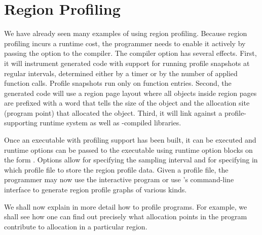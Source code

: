 \documentclass[12pt]{book}
\begin{document}
\chapter{Region Profiling}
\label{useOfProf.sec}

We have already seen many examples of using region profiling. Because region
profiling incurs a runtime cost, the programmer needs to enable it actively by
passing the option  to the  compiler. The compiler
option  has several effects. First, it will instrument generated
code with support for running profile snapshots at regular intervals, determined
either by a timer or by the number of applied function calls. Profile snapshots
run only on function entries. Second, the generated code will use a region page
layout where all objects inside region pages are prefixed with a word that tells
the size of the object and the allocation site (program point) that allocated
the object. Third, it will link against a profile-supporting runtime system as
well as -compiled libraries.

Once an executable with profiling support has been built, it can be executed and
runtime options can be passed to the executable using runtime option blocks on
the form . Options allow for specifying the sampling interval
and for specifying in which profile file to store the region profile data. Given a
profile file, the programmer may now use the interactive  program or
use 's command-line interface to generate region profile graphs of
various kinds.

We shall now explain in more detail how to profile programs. For example, we
shall see how one can find out precisely what allocation points in the program
contribute to allocation in a particular region.
\end{document}
